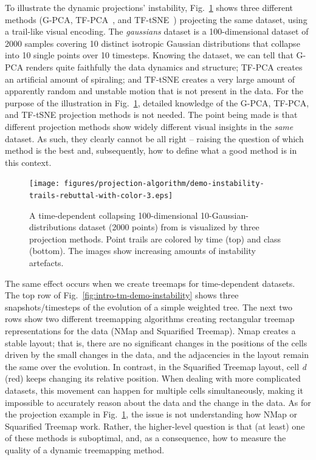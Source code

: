 To illustrate the dynamic projections' instability, Fig.~\ref{fig:intro-pj-demo-instability} shows three different methods (G-PCA, TF-PCA~\citep{pca}, and TF-tSNE~\citep{tsne}) projecting the same dataset, using a trail-like visual encoding. The \emph{gaussians} dataset is a 100-dimensional dataset of 2000 samples covering 10 distinct isotropic Gaussian distributions that collapse into 10 single points over 10 timesteps. Knowing the dataset, we can tell that G-PCA renders quite faithfully the data dynamics and structure; TF-PCA creates an artificial amount of spiraling; and TF-tSNE creates a very large amount of apparently random and unstable motion that is not present in the data.  For the purpose of the illustration in Fig.~\ref{fig:intro-pj-demo-instability}, detailed knowledge of the G-PCA, TF-PCA, and TF-tSNE projection methods is not needed. The point being made is that different projection methods show widely different visual insights in the \emph{same} dataset. As such, they clearly cannot be all right -- raising the question of which method is the best and, subsequently, how to define what a good method is in this context.

\begin{figure}[ht]
    \centering
    \texttt{[image: figures/projection-algorithm/demo-instability-trails-rebuttal-with-color-3.eps]}
    \caption{A time-dependent collapsing 100-dimensional 10-Gaussian-distributions dataset (2000 points) from \cite{Rauber2016} is visualized by three projection methods. Point trails are colored by time (top) and class (bottom). The images show increasing amounts of instability artefacts.}
    \label{fig:intro-pj-demo-instability}
\end{figure}

The same effect occurs when we create treemaps for time-dependent datasets. The top row of Fig.~\ref{fig:intro-tm-demo-instability} shows three snapshots/timesteps of the evolution of a simple weighted tree. The next two rows show two different treemapping algorithms creating rectangular treemap representations for the data (NMap and Squarified Treemap). Nmap creates a stable layout; that is, there are no significant changes in the positions of the cells driven by the small changes in the data, and the adjacencies in the layout remain the same over the evolution. In contrast, in the Squarified Treemap layout, cell \emph{d} (red) keeps changing its relative position. When dealing with more complicated datasets, this movement can happen for multiple cells simultaneously, making it impossible to accurately reason about the data and the change in the data. As for the projection example in Fig.~\ref{fig:intro-pj-demo-instability}, the issue is not understanding how NMap or Squarified Treemap work. Rather, the higher-level question is that (at least) one of these methods is suboptimal, and, as a consequence, how to measure the quality of a dynamic treemapping method.

